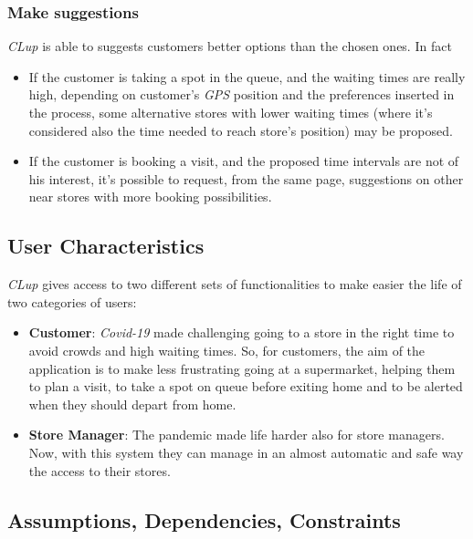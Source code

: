\documentclass{article}
\begin{document}
		\subsubsection{Make suggestions}
		\emph{CLup} is able to suggests customers better options than the chosen ones. In fact
		\begin{itemize}
			\item If the customer is taking a spot in the queue, and the waiting times are really high, depending on customer's \emph{GPS} position and the preferences inserted in the process, some alternative stores with lower waiting times (where it's considered also the time needed to reach store's position) may be proposed.
			\item If the customer is booking a visit, and the proposed time intervals are not of his interest, it's possible to request, from the same page, suggestions on other near stores with more booking possibilities.
		\end{itemize}

	\bigskip
	
	\subsection{User Characteristics}
	
	\emph{CLup} gives access to two different sets of functionalities to make easier the life of two categories of users:
	
	\bigskip
	\begin{itemize}
		
		\item {\bfseries Customer}: \emph{Covid-19} made challenging going to a store in the right time to avoid crowds and high waiting times. So, for customers, the aim of the application is to make less frustrating going at a supermarket, helping them to plan a visit, to take a spot on queue before exiting home and to be alerted when they should depart from home. \\
		
		\item {\bfseries Store Manager}: The pandemic made life harder also for store managers. Now, with this system they can manage in an almost automatic and safe way the access to their stores. \\
		
	\end{itemize}

	\subsection{Assumptions, Dependencies, Constraints}
	
\end{document}
